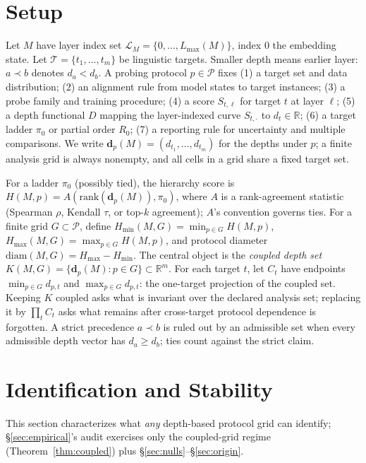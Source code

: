 \documentclass[11pt]{article}
\begin{document}
\section{Setup}
\label{sec:setup}

Let $M$ have layer index set $\mathcal{L}_M=\{0,\dots,L_{\max}(M)\}$, index $0$ the embedding state. Let $\mathcal{T}=\{t_1,\dots,t_m\}$ be linguistic targets. Smaller depth means earlier layer: $a\prec b$ denotes $d_a<d_b$. A probing protocol $p\in\mathcal{P}$ fixes (1) a target set and data distribution; (2) an alignment rule from model states to target instances; (3) a probe family and training procedure; (4) a score $S_{t,\ell}$ for target $t$ at layer $\ell$; (5) a depth functional $D$ mapping the layer-indexed curve $S_{t,\cdot}$ to $d_t\in\mathbb{R}$; (6) a target ladder $\pi_0$ or partial order $R_0$; (7) a reporting rule for uncertainty and multiple comparisons. We write $\mathbf{d}_p(M)=(d_{t_1},\dots,d_{t_m})$ for the depths under $p$; a finite analysis grid is always nonempty, and all cells in a grid share a fixed target set.

For a ladder $\pi_0$ (possibly tied), the hierarchy score is $H(M,p)=A(\mathrm{rank}(\mathbf{d}_p(M)),\pi_0)$, where $A$ is a rank-agreement statistic (Spearman $\rho$, Kendall $\tau$, or top-$k$ agreement); $A$'s convention governs ties. For a finite grid $G\subset\mathcal{P}$, define $H_{\min}(M,G)=\min_{p\in G}H(M,p)$, $H_{\max}(M,G)=\max_{p\in G}H(M,p)$, and protocol diameter $\mathrm{diam}(M,G)=H_{\max}-H_{\min}$. The central object is the \emph{coupled depth set} $K(M,G)=\{\mathbf{d}_p(M):p\in G\}\subset\mathbb{R}^m$. For each target $t$, let $C_t$ have endpoints $\min_{p\in G}d_{p,t}$ and $\max_{p\in G}d_{p,t}$: the one-target projection of the coupled set. Keeping $K$ coupled asks what is invariant over the declared analysis set; replacing it by $\prod_t C_t$ asks what remains after cross-target protocol dependence is forgotten. A strict precedence $a\prec b$ is ruled out by an admissible set when every admissible depth vector has $d_a\ge d_b$; ties count against the strict claim.

\section{Identification and Stability}
\label{sec:ident}

This section characterizes what \emph{any} depth-based protocol grid can identify; \S\ref{sec:empirical}'s audit exercises only the coupled-grid regime (Theorem~\ref{thm:coupled}) plus \S\ref{sec:nulls}--\S\ref{sec:origin}.
\end{document}

